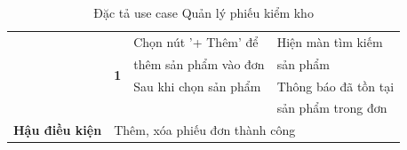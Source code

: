 \documentclass[../DoAn.tex]{subfiles}
\begin{document}
\begin{table}[H]
\begin{tabular}{|l|c|l|l|}
                                                 & \multirow{4}{*}{\textbf{1}}                                   & Chọn nút '+ Thêm' để                      & Hiện màn tìm kiếm                               \\
                                                 &                                                               & thêm sản phẩm vào đơn                     & sản phẩm                                        \\ \cline{3-4}
                                                 &                                                               & Sau khi chọn sản phẩm                     & Thông báo đã tồn tại                            \\
                                                 &                                                               &                                           & sản phẩm trong đơn                              \\ \hline
        \textbf{Hậu điều kiện}                   & \multicolumn{3}{l|}{Thêm, xóa phiếu đơn thành công}                                                                                                         \\ \hline
    \end{tabular}
    \caption{Đặc tả use case Quản lý phiếu kiểm kho}
    \label{table:uc-auditreport-manage}
\end{table}
\vfill
\break
\end{document}
